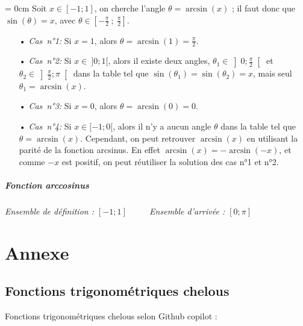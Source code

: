 \documentclass[a4paper]{article}
\begin{document}
					\vspace{2 mm}

					{\parindent = 0cm Soit $x \in [-1;1]$, on cherche l'angle $\theta = \arcsin(x)$ ; il faut donc que $\sin(\theta) = x$, 
					avec $\theta \in \left[-\frac{\pi}{2}~;~\frac{\pi}{2}\right]$.}

					
					\begin{itemize}
						\item [•] \emph{Cas~n°1:} Si $x = 1$, alors $\theta = \arcsin(1) = \frac{\pi}{2}$.
						\vspace{2 mm}
						\item [•] \emph{Cas~n°2:} Si $x \in ~ ]0;1[$, alors il existe deux angles, $\theta_1 \in \left]0;\frac{\pi}{2}\right[$ et $\theta_2 \in \left]\frac{\pi}{2};\pi\right[$ dans la table tel que $\sin(\theta_1) = \sin(\theta_2) = x$, mais seul \emph{$\theta_1 = \arcsin(x)$}.
						\vspace{2 mm}
						\item [•] \emph{Cas~n°3:} Si $x = 0$, alors $\theta = \arcsin(0) = 0$.
						\vspace{2 mm}
						\item [•] \emph{Cas~n°4:} Si $x \in [-1;0[$, alors il n'y a aucun angle $\theta$ dans la table tel que $\theta = \arcsin(x)$. Cependant, on peut retrouver $\arcsin(x)$ en utilisant la parité de la fonction arcsinus. En effet $\arcsin(x) = -\arcsin(-x)$, et comme $-x$ est positif, on peut réutiliser la solution des cas n°1 et n°2.
					\end{itemize}

				\subparagraph*{Fonction arccosinus}
					\textit{Ensemble de définition : $[-1;1]$} ~~~~	\textit{Ensemble d'arrivée : $[0;\pi]$}



\newpage

	\section{Annexe}

		\subsection*{Fonctions trigonométriques chelous} \label{fonction_trigo_chelous}

		Fonctions trigonométriques chelous selon Github copilot :
\end{document}

